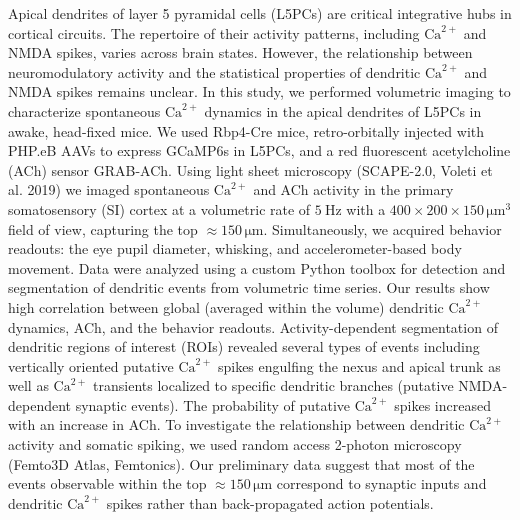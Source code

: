 
Apical dendrites of layer 5 pyramidal cells (L5PCs) are critical integrative hubs in cortical circuits. 
The repertoire of their activity patterns, including $\mathrm{Ca}^{2+}$ and NMDA spikes, varies across brain states.
However, the relationship between neuromodulatory activity and the statistical properties of dendritic $\mathrm{Ca}^{2+}$ and NMDA spikes remains unclear.
In this study, we performed volumetric imaging to characterize spontaneous $\mathrm{Ca}^{2+}$ dynamics in the apical dendrites of L5PCs in awake, head-fixed mice. 
We used Rbp4-Cre mice, retro-orbitally injected with PHP.eB AAVs to express GCaMP6s in L5PCs, and a red fluorescent acetylcholine (ACh) sensor GRAB-ACh. 
Using light sheet microscopy (SCAPE-2.0, Voleti et al. 2019) we imaged spontaneous $\mathrm{Ca}^{2+}$ and ACh activity in the primary somatosensory (SI) cortex at a volumetric rate of $\SI{5}{\hertz}$ with a $400 \times 200 \times 150 \,\mathrm{\mu m}^3$ field of view, capturing the top $\approx 150 \,\mathrm{\mu m}$.
Simultaneously, we acquired behavior readouts: the eye pupil diameter, whisking, and accelerometer-based body movement. 
Data were analyzed using a custom Python toolbox for detection and segmentation of dendritic events from volumetric time series.
Our results show high correlation between global (averaged within the volume) dendritic $\mathrm{Ca}^{2+}$ dynamics, ACh, and the behavior readouts.
Activity-dependent segmentation of dendritic regions of interest (ROIs) revealed several types of events including vertically oriented putative $\mathrm{Ca}^{2+}$ spikes engulfing the nexus and apical trunk as well as $\mathrm{Ca}^{2+}$ transients localized to specific dendritic branches (putative NMDA-dependent synaptic events).
The probability of putative $\mathrm{Ca}^{2+}$ spikes increased with an increase in ACh. 
To investigate the relationship between dendritic $\mathrm{Ca}^{2+}$ activity and somatic spiking, we used random access 2-photon microscopy (Femto3D Atlas, Femtonics). 
Our preliminary data suggest that most of the events observable within the top $\approx 150 \,\mathrm{\mu m}$ correspond to synaptic inputs and dendritic $\mathrm{Ca}^{2+}$ spikes rather than back-propagated action potentials.
